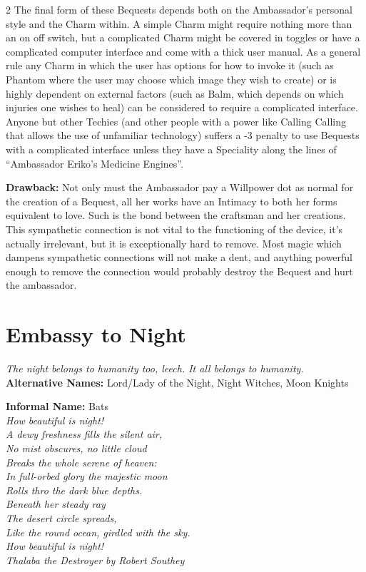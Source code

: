 \begin{multicols}{2}
The final form of these Bequests depends both on the Ambassador's personal style and the Charm within. A simple Charm might require nothing more than an on off switch, but a complicated Charm might be covered in toggles or have a complicated computer interface and come with a thick user manual. As a general rule any Charm in which the user has options for how to invoke it (such as Phantom where the user may choose which image they wish to create) or is highly dependent on external factors (such as Balm, which depends on which injuries one wishes to heal) can be considered to require a complicated interface. Anyone but other Techies (and other people with a power like Calling Calling that allows the use of unfamiliar technology) suffers a -3 penalty to use Bequests with a complicated interface unless they have a Speciality along the lines of \textquotedblleft Ambassador Eriko's Medicine Engines\textquotedblright .

\textbf{Drawback:} Not only must the Ambassador pay a Willpower dot as normal for the creation of a Bequest, all her works have an Intimacy to both her forms equivalent to love.  Such is the bond between the craftsman and her creations. This sympathetic connection is not vital to the functioning of the device, it's actually irrelevant, but it is exceptionally hard to remove. Most magic which dampens sympathetic connections will not make a dent, and anything powerful enough to remove the connection would probably destroy the Bequest and hurt the ambassador.

\section*{Embassy to Night}
\label{sec:EmbassyNight}

\textit{The night belongs to humanity too, leech. It all belongs to humanity. }\\

\noindent \textbf{Alternative Names:} Lord/Lady of the Night, Night Witches, Moon Knights

\noindent \textbf{Informal Name:} Bats	\\

\noindent \textit{How beautiful is night!}\\
\noindent \textit{A dewy freshness fills the silent air,}\\
\noindent \textit{No mist obscures, no little cloud}\\
\noindent \textit{Breaks the whole serene of heaven:}\\
\noindent \textit{In full-orbed glory the majestic moon}\\
\noindent \textit{Rolls thro the dark blue depths.}\\
\noindent \textit{Beneath her steady ray}\\
\noindent \textit{The desert circle spreads,}\\
\noindent \textit{Like the round ocean, girdled with the sky.}\\
\noindent \textit{How beautiful is night!}\\
\noindent \textemdash \textit{Thalaba the Destroyer by Robert Southey}\\


\end{multicols}
